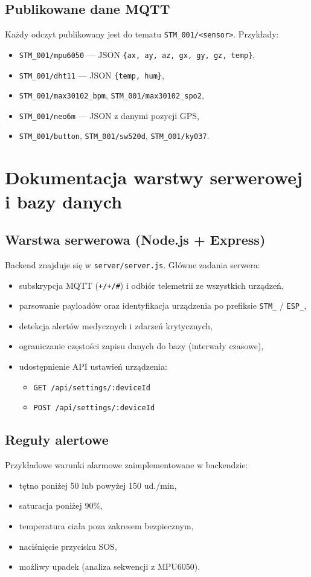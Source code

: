 \documentclass[a4paper,12pt]{article}
\begin{document}
\subsection{Publikowane dane MQTT}
Każdy odczyt publikowany jest do tematu \texttt{STM\_001/<sensor>}. Przykłady:
\begin{itemize}
  \item \texttt{STM\_001/mpu6050} --- JSON \texttt{\{ax, ay, az, gx, gy, gz, temp\}},
  \item \texttt{STM\_001/dht11} --- JSON \texttt{\{temp, hum\}},
  \item \texttt{STM\_001/max30102\_bpm}, \texttt{STM\_001/max30102\_spo2},
  \item \texttt{STM\_001/neo6m} --- JSON z danymi pozycji GPS,
  \item \texttt{STM\_001/button}, \texttt{STM\_001/sw520d}, \texttt{STM\_001/ky037}.
\end{itemize}

\section{Dokumentacja warstwy serwerowej i bazy danych}
\subsection{Warstwa serwerowa (Node.js + Express)}
Backend znajduje się w \texttt{server/server.js}. Główne zadania serwera:
\begin{itemize}
  \item subskrypcja MQTT (\texttt{+/+/\#}) i odbiór telemetrii ze wszystkich urządzeń,
  \item parsowanie payloadów oraz identyfikacja urządzenia po prefiksie \texttt{STM\_} / \texttt{ESP\_},
  \item detekcja alertów medycznych i zdarzeń krytycznych,
  \item ograniczanie częstości zapisu danych do bazy (interwały czasowe),
  \item udostępnienie API ustawień urządzenia:
  \begin{itemize}
    \item \texttt{GET /api/settings/:deviceId}
    \item \texttt{POST /api/settings/:deviceId}
  \end{itemize}
\end{itemize}

\subsection{Reguły alertowe}
Przykładowe warunki alarmowe zaimplementowane w backendzie:
\begin{itemize}
  \item tętno poniżej 50 lub powyżej 150 ud./min,
  \item saturacja poniżej 90\%,
  \item temperatura ciała poza zakresem bezpiecznym,
  \item naciśnięcie przycisku SOS,
  \item możliwy upadek (analiza sekwencji z MPU6050).
\end{itemize}
\end{document}
